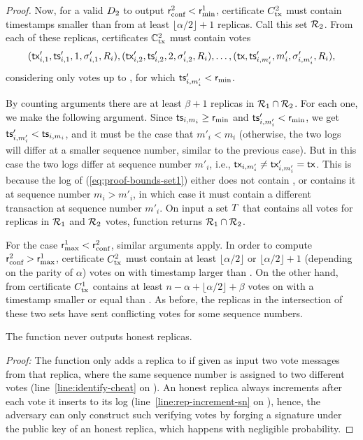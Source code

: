 \begin{proof}
	Now, for a valid $D_2$ to output $\textsf{r}_\text{conf}^2 < \textsf{r}_\text{min}^1$, certificate $C_\text{tx}^2$ must contain timestamps smaller than \rmin from at least $\lfloor \alpha / 2 \rfloor + 1$ replicas. Call this set $\mathcal{R}_2$. From each of these replicas, certificates $\mathbb{C}_\text{tx}^2$ must contain votes
	\begin{equation}\label{eq:proof-bounds-set2}
		(\textsf{tx}'_{i,1}, \textsf{ts}'_{i,1}, 1, \sigma'_{i,1}, R_i), (\textsf{tx}'_{i,2}, \textsf{ts}'_{i,2}, 2, \sigma'_{i,2}, R_i), \ldots, (\textsf{tx}, \textsf{ts}'_{i, m'_i}, m'_i, \sigma'_{i, m'_i}, R_i),
	\end{equation}
	considering only votes up to \tx, for which $\textsf{ts}'_{i, m'_i} < \textsf{r}_\text{min}$.

	By counting arguments there are at least $\beta + 1$ replicas in $\mathcal{R}_1 \cap \mathcal{R}_2$.
	For each one, we make the following argument. Since $\textsf{ts}_{i, m_i} \geq \textsf{r}_\text{min}$ and $\textsf{ts}'_{i, m'_i} < \textsf{r}_\text{min}$, we get $\textsf{ts}'_{i, m'_i} < \textsf{ts}_{i, m_i}$, and it must be the case that $m'_i < m_i$ (otherwise, the two logs will differ at a smaller sequence number, similar to the previous case).
	But in this case the two logs differ at sequence number $m'_i$, i.e., $\textsf{tx}_{i,m'_i} \neq \textsf{tx}'_{i,m'_i} = \textsf{tx}$.
	This is because the log of (\ref{eq:proof-bounds-set1}) either does not contain \tx, or contains it at sequence number $m_i > m'_i$, in which case it must contain a different transaction at sequence number $m'_i$.
	On input a set $T$ that contains all votes for replicas in $\mathcal{R}_1$ and $\mathcal{R}_2$ votes, function \identify{\tran} returns $\mathcal{R}_1 \cap \mathcal{R}_2$.

	For the case $\textsf{r}_\text{max}^1 < \textsf{r}_\text{conf}^2$, similar arguments apply.
	In order to compute $\textsf{r}_\text{conf}^2 > \textsf{r}_\text{max}^1$, certificate $C_\text{tx}^2$ must contain at least $\lfloor \alpha / 2 \rfloor$ or $\lfloor \alpha / 2 \rfloor + 1$ (depending on the parity of $\alpha$) votes on \tx with timestamp larger than \rmax.
	On the other hand, from  certificate $C_\text{tx}^1$ contains at least $n - \alpha + \lfloor \alpha / 2 \rfloor + \beta$ votes on \tx with a timestamp smaller or equal than \rmax.
	As before, the replicas in the intersection of these two sets have sent conflicting votes for some sequence numbers.

	The \identify{} function never outputs honest replicas.

	\noindent
	\emph{Proof:} The function only adds a replica to \cheaters if given as input two vote messages from that replica, where the same sequence number is assigned to two different votes (line~\ref{line:identify-cheat} on ). An honest replica always increments \nextsn after each vote it inserts to its log (line~\ref{line:rep-increment-sn} on ), hence, the adversary can only construct such verifying votes by forging a signature under the public key of an honest replica, which happens with negligible probability.
\end{proof}